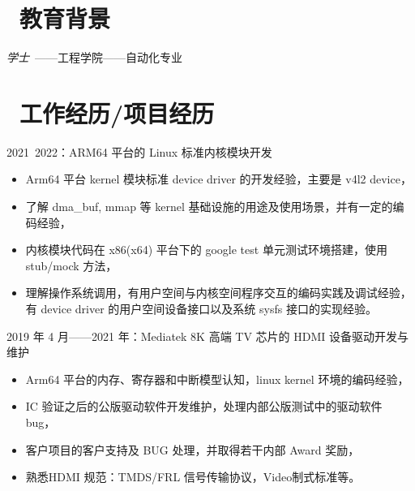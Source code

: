 \documentclass{resume}
\begin{document}



\section{\faGraduationCap\ 教育背景}
\textit{学士}\ ——工程学院——自动化专业

\section{\faUsers\ 工作经历/项目经历}

2021~2022：ARM64 平台的 Linux 标准内核模块开发
\begin{itemize}
  \item Arm64 平台 kernel 模块标准 device driver 的开发经验，主要是 v4l2 device，
  \item 了解 dma\_buf, mmap 等 kernel 基础设施的用途及使用场景，并有一定的编码经验，
  \item 内核模块代码在 x86(x64) 平台下的 google test 单元测试环境搭建，使用 stub/mock 方法，
  \item 理解操作系统调用，有用户空间与内核空间程序交互的编码实践及调试经验，有 device driver 的用户空间设备接口以及系统 sysfs 接口的实现经验。
\end{itemize}

2019 年 4 月——2021 年：Mediatek 8K 高端 TV 芯片的 HDMI 设备驱动开发与维护
\begin{itemize}
  \item Arm64 平台的内存、寄存器和中断模型认知，linux kernel 环境的编码经验，
  \item IC 验证之后的公版驱动软件开发维护，处理内部公版测试中的驱动软件 bug，
  \item 客户项目的客户支持及 BUG 处理，并取得若干内部 Award 奖励，
  \item 熟悉HDMI 规范：TMDS/FRL 信号传输协议，Video制式标准等。
\end{itemize}
\end{document}
